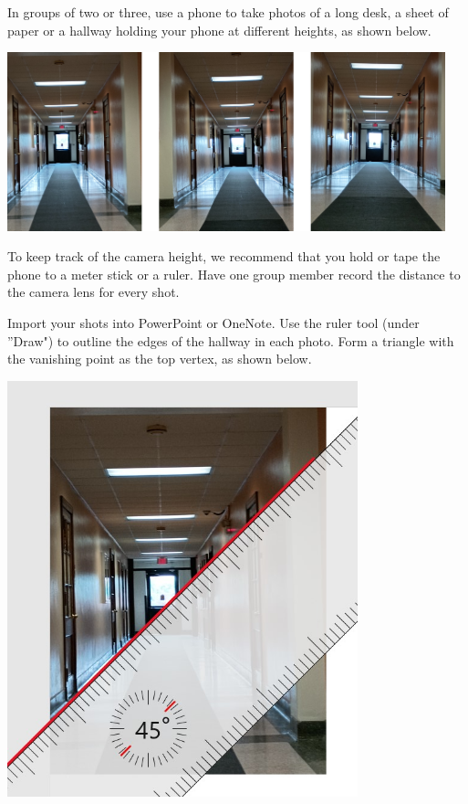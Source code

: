 \documentclass{ximera}
\begin{document}
\begin{exploration}\label{exp:hallway}
In groups of two or three, use a phone to take photos of a long desk, a sheet of paper or a hallway holding your phone at different heights, as shown below.

\begin{image}
         \includegraphics[width=5in]{threeHallways.jpg}
\end{image}

To keep track of the camera height, we recommend that you hold or tape the phone to a meter stick or a ruler. Have one group member record the distance to the camera lens for every shot.  

Import your shots into PowerPoint or OneNote.  Use the ruler tool (under ''Draw") to outline the edges of the hallway in each photo. Form a triangle with the vanishing point as the top vertex, as shown below.

\begin{image}
         \includegraphics[width=4in]{ruler.jpg}
\end{image}


\end{exploration}
\end{document}
